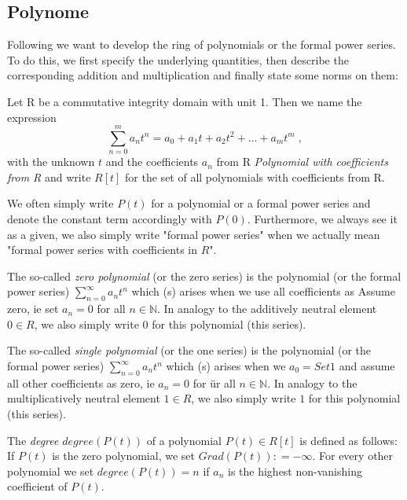 \subsection{Polynome}
Following \cite{LK} we want to develop the ring of polynomials or the formal power series. To do this, we first specify the underlying quantities, then describe the corresponding addition and multiplication and finally state some norms on them:
\begin{definition} [Polynomials]
Let R be a commutative integrity domain with unit 1.
Then we name the expression
\begin{equation}
\sum _{n = 0} ^{m}{a} _{n}{t} ^{n} ={a} _{0} +{a} _{1} t +{a} _{2} t ^ 2 + \dots + a_m t ^ m \;,
\end{equation}
with the unknown $ t $ and the coefficients $ a_n $ from R
\textit{Polynomial with coefficients from R} and write
$ R [t] $ for the set of all polynomials with coefficients from R.
\end{definition}
We often simply write $ P (t) $ for a polynomial or a formal power series and denote the constant term accordingly with $ P (0) $. Furthermore, we always see it as a given, we also simply write "formal power series" when we actually mean "formal power series with coefficients in $ R $".
\begin{example}
\label{def: zero polynomial}
The so-called \textit{zero polynomial} (or the zero series) is the polynomial (or the formal power series) $ \sum_{n = 0} ^ \infty a_n t ^ n $ which (s) arises when we use all coefficients as Assume zero, ie set $ a_n = 0 $ for all $ n \in \mathbb{N} $. In analogy to the additively neutral element $ 0 \in R $, we also simply write $ 0 $ for this polynomial (this series).

The so-called \textit{single polynomial} (or the one series) is the polynomial (or the formal power series) $ \sum_{n = 0} ^ \infty a_n t ^ n $ which (s) arises when we $ a_0 = Set 1 $ and assume all other coefficients as zero, ie $ a_n = 0 $ for \"ur all $ n \in \mathbb{N} $. In analogy to the multiplicatively neutral element $ 1 \in R $, we also simply write $ 1 $ for this polynomial (this series).
\end{example}
\begin{definition} [degree] The \textit{degree} $ degree (P (t)) $ of a polynomial
$ P (t) \in R [t] $ is defined as follows: If $ P (t) $ is the zero polynomial, we set $ Grad (P (t)): = - \infty $. For every other polynomial we set $ degree (P (t)) = n $ if $ a_n $ is the highest non-vanishing coefficient of $ P (t) $.
\end{definition}
